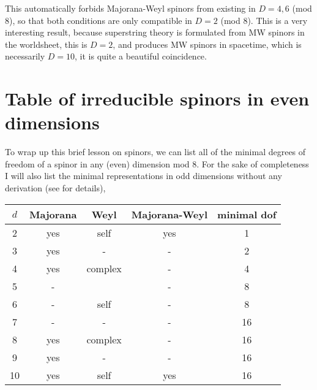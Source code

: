 This automatically forbids Majorana-Weyl spinors from existing in $D = 4, 6$ (mod 8), so that both conditions are only compatible in $D = 2$ (mod 8). This is a very interesting result, because superstring theory is formulated from MW spinors in the worldsheet, this is $D = 2$, and produces MW spinors in spacetime, which is necessarily $D = 10$, it is quite a beautiful coincidence.


\section{Table of irreducible spinors in even dimensions}

To wrap up this brief lesson on spinors, we can list all of the minimal degrees of freedom of a spinor in any (even) dimension mod 8. For the sake of completeness I will also list the minimal representations in odd dimensions without any derivation (see \cite{Polchinski_1998} for details),

\begin{table}[h]
    \centering
    \begin{tabular}{ccccc}
    $d$ & Majorana & Weyl    & Majorana-Weyl & minimal dof \\ \hline
    2   & yes      & self    & yes           & 1           \\
    3   & yes      & -       & -             & 2           \\
    4   & yes      & complex & -             & 4           \\
    5   & -        &         & -             & 8           \\
    6   & -        & self    & -             & 8           \\
    7   & -        & -       & -             & 16          \\
    8   & yes      & complex & -             & 16          \\
    9   & yes      & -       & -             & 16          \\
    10  & yes      & self    & yes           & 16         
\end{tabular}
\end{table}